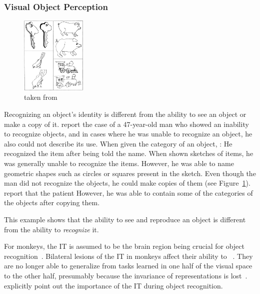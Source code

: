 \subsubsection{Visual Object Perception}\label{subsec:visual-object-perception}

\begin{figure}
    \begin{center}
        \includegraphics[width=0.28\textwidth]{images/rubens_sketches.jpg}
    \end{center}
    \caption[Copies of line drawings]{ taken from \citet{rubens1971associative}}
    \label{fig:copies_line_drawings}
\end{figure}
Recognizing an object's identity is different from the ability to see an object or make a copy of it.
\citet{rubens1971associative} report the case of a 47-year-old man who showed an inability to recognize objects, and in cases where he was unable to recognize an object, he also could not describe its use.
When given the category of an object, :
He recognized the item after being told the name.
When shown sketches of items, he was generally unable to recognize the items.
However, he was able to name geometric shapes such as circles or squares present in the sketch.
Even though the man did not recognize the objects, he could make copies of them (see Figure~\ref{fig:copies_line_drawings}).
\citet{rubens1971associative} report that the patient 
However, he was able to contain some of the categories of the objects after copying them.

This example shows that the ability to see and reproduce an object is different from the ability to \textit{recognize} it.

For monkeys, the \ac{IT} is assumed to be the brain region being crucial for object recognition~\citep[pp. 1070, 1071]{squire2012fundamental}.
Bilateral lesions of the \ac{IT} in monkeys affect their ability to ~\citep[p. 1070]{squire2012fundamental}.
They are no longer able to generalize from tasks learned in one half of the visual space to the other half, presumably because the invariance of representations is lost~\citep[p. 1070]{squire2012fundamental}.
\citet[p. 1071]{squire2012fundamental} explicitly point out the importance of the \ac{IT} during object recognition.

